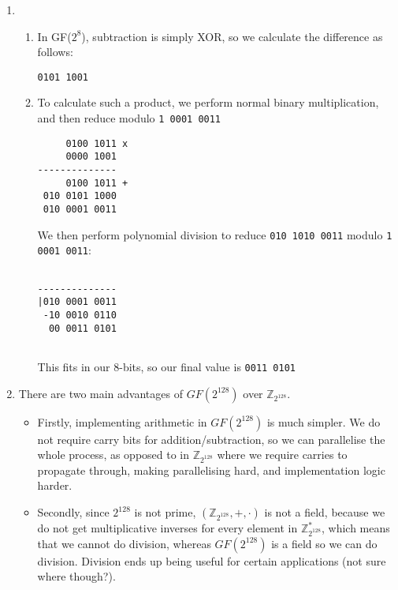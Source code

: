 


\begin{enumerate}[label=(\alph*)]
  \item
    \begin{enumerate}[label=(\roman*)]
      \item
        
    In GF($2^8$), subtraction is simply XOR, so we calculate the difference as follows:

    \texttt{0101 1001}

  \item
    To calculate such a product, we perform normal binary multiplication, and then reduce modulo \texttt{1 0001 0011}

\begin{verbatim}
     0100 1011 x
     0000 1001
--------------
     0100 1011 +
 010 0101 1000
 010 0001 0011
\end{verbatim}

We then perform polynomial division to reduce \texttt{010 1010 0011} modulo \texttt{1 0001 0011}:

\begin{verbatim}

--------------
|010 0001 0011
 -10 0010 0110
  00 0011 0101
            
\end{verbatim}

This fits in our 8-bits, so our final value is \texttt{0011 0101}

    \end{enumerate}
\item
  There are two main advantages of $GF(2^{128})$ over $\mathbb{Z}_{2^{128}}$.

  \begin{itemize}
    \item
      Firstly, implementing arithmetic in $GF(2^{128})$ is much simpler. We do not require carry bits for addition/subtraction, so we can parallelise the whole process, as opposed to in $\mathbb{Z}_{2^{128}}$ where we require carries to propagate through, making parallelising hard, and implementation logic harder.

    \item
      Secondly, since $2^{128}$ is not prime, $(\mathbb{Z}_{2^{128}}, +, \cdot)$ is not a field, because we do not get multiplicative inverses for every element in $\mathbb{Z}^*_{2^{128}}$, which means that we cannot do division, whereas $GF(2^{128})$ is a field so we can do division. Division ends up being useful for certain applications (not sure where though?).


\end{itemize}
\end{enumerate}
